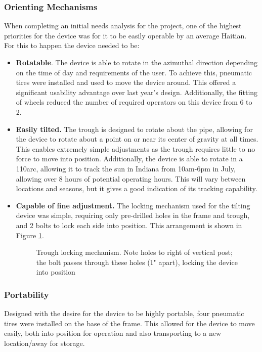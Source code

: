 \documentclass[11pt,english]{article}
\begin{document}
\subsubsection*{Orienting Mechanisms}
When completing an initial needs analysis for the project, one of the highest priorities for the device was for it to be easily operable by an average Haitian. For this to happen the device needed to be:
\begin{itemize}
\item \textbf{Rotatable}. The device is able to rotate in the azimuthal direction depending on the time of day and requirements of the user. To achieve this, pneumatic tires were installed and used to move the  device around. This offered a significant usability advantage over last year's design. Additionally, the fitting of wheels reduced the number of required operators on this device from 6 to 2. \item \textbf{Easily tilted.}  The trough is designed to rotate about the pipe, allowing for the device to rotate about a point on or near its center of gravity at all times. This enables extremely simple adjustments as the trough requires little to no force to move into position. Additionally, the device is able to rotate in a 110\degree arc, allowing it to track the sun in Indiana from 10am-6pm in July,  allowing over 8 hours of potential operating hours. This will vary between locations and seasons, but it gives a good indication of its tracking capability. \item \textbf{Capable of fine adjustment.} The locking mechanism used for the tilting device was simple, requiring only pre-drilled holes in the frame and trough, and 2 bolts to lock each side into position. This arrangement is shown in Figure \ref{fig:orientationtrough1}.

\begin{figure}[ht!]%
    \centering
    \qquad
    \caption{Trough locking mechanism. Note holes to right of vertical post; the bolt passes through these holes (1" apart), locking the device into position}
\label{fig:orientationtrough1}
\end{figure}
\end{itemize}
\subsubsection*{Portability}
Designed with the desire for the device to be highly portable, four pneumatic tires were installed on the base of the frame. This allowed for the device to move easily, both into position for operation and also transporting to a new location/away for storage. 
\end{document}
